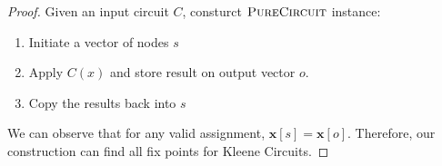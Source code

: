 \begin{proof}
Given an input circuit $C$, consturct $\textsc{PureCircuit}$ instance:
\begin{enumerate}
    \item Initiate a vector of nodes $s$
    \item Apply $C(x)$ and store result on output vector $o$.
    \item Copy the results back into $s$
\end{enumerate}

We can observe that for any valid assignment, $\mathbf{x}[s]= \mathbf{x}[o]$.
Therefore, our construction can find all fix points for Kleene Circuits.
\end{proof}

%
